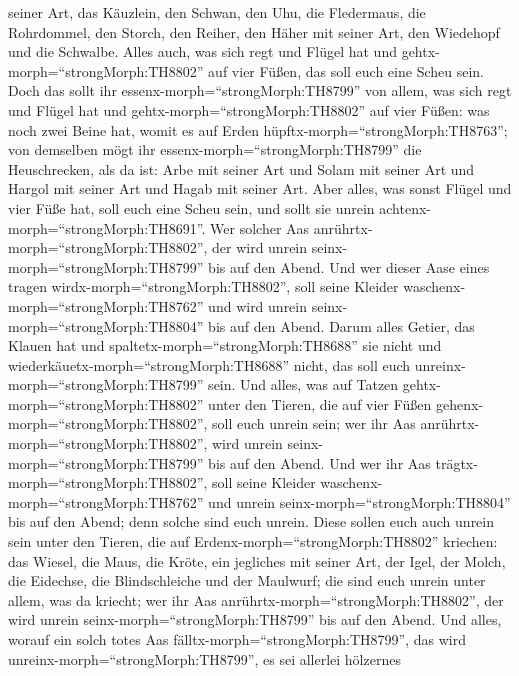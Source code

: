 seiner Art,  das Käuzlein, den Schwan, den Uhu,
 die Fledermaus, die Rohrdommel,  den Storch,
den Reiher, den Häher mit seiner Art, den Wiedehopf und die Schwalbe.
 Alles auch, was sich regt und Flügel hat und
gehtx-morph=``strongMorph:TH8802'' auf vier Füßen, das soll euch eine
Scheu sein.  Doch das sollt ihr
essenx-morph=``strongMorph:TH8799'' von allem, was sich regt und Flügel
hat und gehtx-morph=``strongMorph:TH8802'' auf vier Füßen: was noch zwei
Beine hat, womit es auf Erden hüpftx-morph=``strongMorph:TH8763'';
 von demselben mögt ihr essenx-morph=``strongMorph:TH8799''
die Heuschrecken, als da ist: Arbe mit seiner Art und Solam mit seiner
Art und Hargol mit seiner Art und Hagab mit seiner Art. 
Aber alles, was sonst Flügel und vier Füße hat, soll euch eine Scheu
sein,  und sollt sie unrein
achtenx-morph=``strongMorph:TH8691''. Wer solcher Aas
anrührtx-morph=``strongMorph:TH8802'', der wird unrein
seinx-morph=``strongMorph:TH8799'' bis auf den Abend.  Und
wer dieser Aase eines tragen wirdx-morph=``strongMorph:TH8802'', soll
seine Kleider waschenx-morph=``strongMorph:TH8762'' und wird unrein
seinx-morph=``strongMorph:TH8804'' bis auf den Abend. 
Darum alles Getier, das Klauen hat und
spaltetx-morph=``strongMorph:TH8688'' sie nicht und
wiederkäuetx-morph=``strongMorph:TH8688'' nicht, das soll euch
unreinx-morph=``strongMorph:TH8799'' sein.  Und alles, was
auf Tatzen gehtx-morph=``strongMorph:TH8802'' unter den Tieren, die auf
vier Füßen gehenx-morph=``strongMorph:TH8802'', soll euch unrein sein;
wer ihr Aas anrührtx-morph=``strongMorph:TH8802'', wird unrein
seinx-morph=``strongMorph:TH8799'' bis auf den Abend.  Und
wer ihr Aas trägtx-morph=``strongMorph:TH8802'', soll seine Kleider
waschenx-morph=``strongMorph:TH8762'' und unrein
seinx-morph=``strongMorph:TH8804'' bis auf den Abend; denn solche sind
euch unrein.  Diese sollen euch auch unrein sein unter den
Tieren, die auf Erdenx-morph=``strongMorph:TH8802'' kriechen: das
Wiesel, die Maus, die Kröte, ein jegliches mit seiner Art, 
der Igel, der Molch, die Eidechse, die Blindschleiche und der Maulwurf;
 die sind euch unrein unter allem, was da kriecht; wer ihr
Aas anrührtx-morph=``strongMorph:TH8802'', der wird unrein
seinx-morph=``strongMorph:TH8799'' bis auf den Abend.  Und
alles, worauf ein solch totes Aas fälltx-morph=``strongMorph:TH8799'',
das wird unreinx-morph=``strongMorph:TH8799'', es sei allerlei hölzernes
